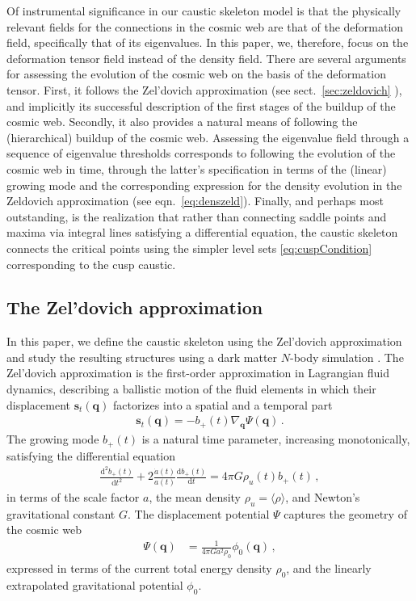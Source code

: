 \documentclass[a4paper, 11pt]{article}
\begin{document}
Of instrumental significance in our caustic skeleton model is that the physically relevant fields for the connections in the cosmic web are that of the deformation field, specifically that of its eigenvalues. In this paper, we, therefore, focus on the deformation tensor field instead of the density field. There are several arguments for assessing the evolution of the cosmic web on the basis of the deformation tensor. First, it follows the Zel'dovich approximation (see sect.~\ref{sec:zeldovich} \citep{Zeldovich:1970,Shandarin:1989,Shandarin:2009}), and implicitly its successful description of the first stages of the buildup of the cosmic web.  Secondly, it also provides a natural means of following the (hierarchical) buildup of the cosmic web. Assessing the eigenvalue field through a sequence of eigenvalue thresholds corresponds to following the evolution of the cosmic web in time, through the latter's specification in terms of the (linear) growing mode and the corresponding expression for the density evolution in the Zeldovich approximation (see eqn.~\ref{eq:denszeld}). Finally, and perhaps most outstanding, is the realization that rather than connecting saddle points and maxima via integral lines satisfying a differential equation, the caustic skeleton connects the critical points using the simpler level sets \eqref{eq:cuspCondition} corresponding to the cusp caustic. 

\subsection{The Zel'dovich approximation}\label{sec:Zeldovich}
\label{sec:zeldovich}
In this paper, we define the caustic skeleton using the Zel'dovich approximation \cite{Zeldovich:1970} and study the resulting structures using a dark matter $N$-body simulation \cite{Hidding:2020}. The Zel'dovich approximation is the first-order approximation in Lagrangian fluid dynamics, describing a ballistic motion of the fluid elements in which their displacement $\bm{s}_t(\bm{q})$ factorizes into a spatial and a temporal part
\begin{align}
\bm{s}_t(\bm{q}) = - b_+(t) \nabla_{\bm{q}} \Psi(\bm{q})\,.
\end{align}
The growing mode $b_+(t)$ is a natural time parameter, increasing monotonically, satisfying the differential equation
\begin{align}
\frac{\mathrm{d}^2 b_+(t)}{\mathrm{d}t^2} + 2 \frac{\dot{a}(t)}{a(t)} \frac{\mathrm{d} b_+(t)}{\mathrm{d}t} = 4 \pi G \rho_u(t) b_+(t)\,,
\end{align}
in terms of the scale factor $a$, the mean density $\rho_u = \langle \rho \rangle$, and Newton's gravitational constant $G$. The displacement potential $\Psi$ captures the geometry of the cosmic web
\begin{align}
\Psi(\bm{q}) &=\frac{1}{4 \pi G a^2 \rho_0}\phi_0(\bm{q})%
\,,
\end{align}
expressed in terms of the current total energy density %
$\rho_0$,
and the linearly extrapolated gravitational potential $\phi_0$.
\end{document}
